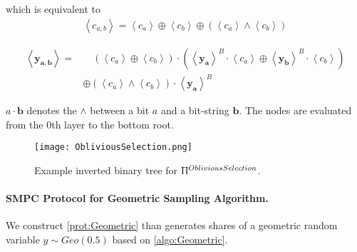 which is equivalent to
\begin{equation}
    \begin{split}
        \left\langle c_{a,b}\right\rangle=\left\langle c_{a}\right\rangle\oplus \left\langle c_{b}\right\rangle \oplus \left(\left\langle c_{a}\right\rangle \land\left\langle c_{b}\right\rangle\right)
    \end{split}
\end{equation}

\begin{equation}
    \begin{split}
        \left\langle \boldsymbol{y_{a,b}}\right\rangle=& \quad \left(\left\langle c_{a}\right\rangle\oplus \left\langle c_{b}\right\rangle\right) \cdot \left(\left\langle \boldsymbol{y_{a}}\right\rangle ^{B}\cdot \left\langle c_{a}\right\rangle \oplus  \left\langle \boldsymbol{y_{b}}\right\rangle ^{B} \cdot \left\langle c_{b}\right\rangle \right)  \\
        & \oplus \left(\left\langle c_{a}\right\rangle \land\left\langle c_{b}\right\rangle\right) \cdot \left\langle \boldsymbol{y_{a}}\right\rangle ^{B}
    \end{split}
\end{equation}

$a \cdot \boldsymbol{b}$ denotes the $\land$ between a bit $a$ and a bit-string $\boldsymbol{b}$. The nodes are evaluated from the $0$th layer to the bottom root.


\begin{figure}[htbp]
    \texttt{[image: ObliviousSelection.png]}
    \centering
    \caption{Example inverted binary tree for $\Uppi^{ObliviousSelection}$.}
    \label{img:ObliviousSelection}
\end{figure}
\FloatBarrier


\paragraph{SMPC Protocol for Geometric Sampling Algorithm.}
\label{para:GeometricDistribution}
We construct \autoref{prot:Geometric} than generates shares of a geometric random variable $y\sim Geo\left(0.5\right) $ based on \autoref{algo:Geometric}.

